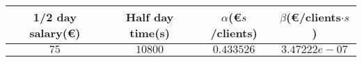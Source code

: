 \begin{tabular}{|c|c|c|c|}
\hline 
1/2 day salary(\euro ) & Half day time(s) & $\alpha$(\euro $s$/clients) & $\beta$(\euro/clients$\cdot s$) \\ 
 \hline 
$75$ & $10800$ & $0.433526$ & $3.47222e-07$ \\ 
 \hline 
 
 \end{tabular}